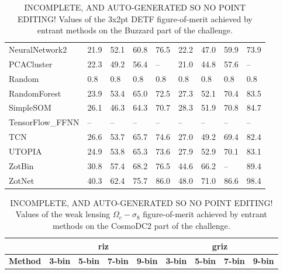 \documentclass[twocolumn,twocolappendix]{aastex63}
\begin{document}
\begin{table}[]
\begin{tabular}{|l|llll|llll|}
{\sc NeuralNetwork2 } & 21.9 & 52.1    & 60.8    & 76.5    & 22.2             & 47.0             & 59.9             & 73.9\\
{\sc PCACluster } & 22.3 & 49.2    & 56.4    & --    & 21.0             & 44.8             & 57.6             & --\\
{\sc Random } & 0.8 & 0.8    & 0.8    & 0.8    & 0.8             & 0.8             & 0.8             & 0.8\\
{\sc RandomForest } & 23.9 & 53.4    & 65.0    & 72.5    & 27.3             & 52.1             & 70.4             & 83.5\\
{\sc SimpleSOM } & 26.1 & 46.3    & 64.3    & 70.7    & 28.3             & 51.9             & 70.8             & 84.7\\
{\sc TensorFlow\_FFNN } & -- & --    & --    & --    & --             & --             & --             & --\\
{\sc TCN } & 26.6 & 53.7    & 65.7    & 74.6    & 27.0             & 49.2             & 69.4             & 82.4\\
{\sc UTOPIA } & 24.9 & 53.8    & 65.3    & 73.6    & 27.9             & 52.9             & 70.1             & 83.1\\
{\sc ZotBin } & 30.8 & 57.4    & 68.2    & 76.5    & 44.6             & 66.2             & --             & 89.4\\
{\sc ZotNet } & 40.3 & 62.4    & 75.7    & 86.0    & 48.0             & 71.0             & 86.6             & 98.4\\
\end{tabular}
\caption{INCOMPLETE, AND AUTO-GENERATED SO NO POINT EDITING! Values of the 3x2pt DETF figure-of-merit achieved by entrant methods on the 
Buzzard part of the challenge.}
\label{tab:buzzard_3x2}
\end{table}

\begin{table}[]
\begin{tabular}{|l|llll|llll|}
                & \multicolumn{4}{c|}{\textbf{riz}}      & \multicolumn{4}{c|}{\textbf{griz}}                                \\ \hline
\textbf{Method} & \textbf{3-bin} & \textbf{5-bin} & \textbf{7-bin} & \textbf{9-bin} & \textbf{3-bin} & \textbf{5-bin} & \textbf{7-bin} & \textbf{9-bin} \\ \hline

\end{tabular}
\caption{INCOMPLETE, AND AUTO-GENERATED SO NO POINT EDITING! Values of the weak lensing $\Omega_c - \sigma_8$
figure-of-merit achieved by entrant methods on the CosmoDC2 part of the challenge.}
\label{tab:dc2_wl}
\end{table}
\end{document}
